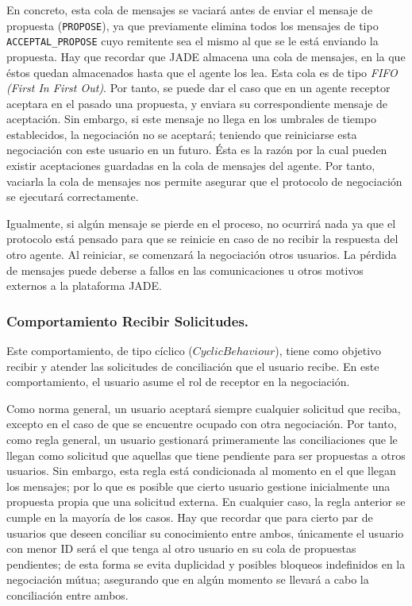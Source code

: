 En concreto, esta cola de mensajes se vaciará antes de enviar el mensaje de propuesta ({\tt PROPOSE}), ya que previamente elimina todos los mensajes de tipo {\tt ACCEPTAL\_\-PROPOSE} cuyo remitente sea el mismo al que se le está enviando la propuesta. Hay que recordar que JADE almacena una cola de mensajes, en la que éstos quedan almacenados hasta que el agente los lea. Esta cola es de tipo \emph{FIFO (First In First Out)}. Por tanto, se puede dar el caso que en un agente receptor aceptara en el pasado una propuesta, y enviara su correspondiente mensaje de aceptación. Sin embargo, si este mensaje no llega en los umbrales de tiempo establecidos, la negociación no se aceptará; teniendo que reiniciarse esta negociación con este usuario en un futuro. Ésta es la razón por la cual pueden existir aceptaciones guardadas en la cola de mensajes del agente. Por tanto, vaciarla la cola de mensajes nos permite asegurar que el protocolo de negociación se ejecutará correctamente.

Igualmente, si algún mensaje se pierde en el proceso, no ocurrirá nada ya que el protocolo está pensado para que se reinicie en caso de no recibir la respuesta del otro agente. Al reiniciar, se comenzará la negociación otros usuarios. La pérdida de mensajes puede deberse a fallos en las comunicaciones u otros motivos externos a la plataforma JADE.





\subsubsection{Comportamiento Recibir Solicitudes.}

Este comportamiento, de tipo cíclico ($CyclicBehaviour$), tiene como objetivo recibir y atender las solicitudes de conciliación que el usuario recibe. En este comportamiento, el usuario asume el rol de receptor en la negociación.

Como norma general, un usuario aceptará siempre cualquier solicitud que reciba, excepto en el caso de que se encuentre ocupado con otra negociación. Por tanto, como regla general, un usuario gestionará primeramente las conciliaciones que le llegan como solicitud que aquellas que tiene pendiente para ser propuestas a otros usuarios. Sin embargo, esta regla está condicionada al momento en el que llegan los mensajes; por lo que es posible que cierto usuario gestione inicialmente una propuesta propia que una solicitud externa. En cualquier caso, la regla anterior se cumple en la mayoría de los casos. Hay que recordar que para cierto par de usuarios que deseen conciliar su conocimiento entre ambos, únicamente el usuario con menor ID será el que tenga al otro usuario en su cola de propuestas pendientes; de esta forma se evita duplicidad y posibles bloqueos indefinidos en la negociación mútua; asegurando que en algún momento se llevará a cabo la conciliación entre ambos.

